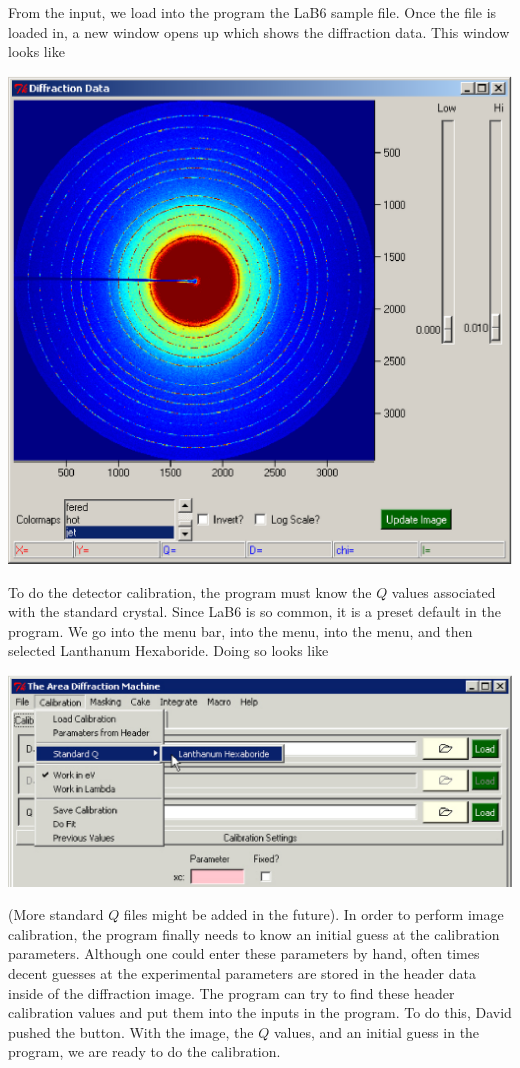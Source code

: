 From the  input, we
load into the program the LaB6 sample file. Once the file
is loaded in, a new window opens up which shows the diffraction
data. This window looks like

\includegraphics[scale=.75]{figures/diffraction_data_window.eps}

To do the detector calibration, the program must know the 
$Q$ values associated 
with the standard crystal. Since LaB6 is so common, it is
a preset default in the program. We go into the menu bar, 
into the  menu, into the  menu, 
and then selected Lanthanum Hexaboride. Doing so looks like

\includegraphics[scale=.75]{figures/standard_q.eps}

(More standard $Q$ files might be added in the future).
In order to perform
image calibration, the program finally needs to know an 
initial guess at the calibration parameters. Although one
could enter these parameters by hand, often times decent
guesses at the experimental parameters are stored in the 
header data inside of the diffraction image. The program
can try to find these header calibration values and put
them into the inputs in the program. To do this, David
pushed the  button. With the image,
the $Q$ values, and an initial guess in the program,
we are ready to do the calibration. 

